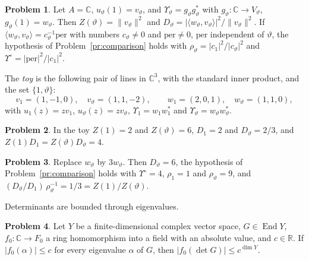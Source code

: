 \documentclass[reqno]{amsart}
\theoremstyle{definition}
\newtheorem{problem}{Problem}[section]
\theoremstyle{plain}
\theoremstyle{remark}
\newcommand{\R}{{\mathbb{R}}}
\newcommand{\C}{{\mathbb{C}}}
\newcommand{\End}{\operatorname{End}}
\begin{document}
\begin{problem}\label{pr:rank-one}
Let \(A = \C\), \(u_\vartheta(1) = v_\vartheta\), and \(\Upsilon_\vartheta = g_\vartheta g_\vartheta^*\) with \(g_\vartheta \colon \C \to V_\vartheta\), \(g_\vartheta(1) = w_\vartheta\).  Then \(Z(\vartheta) = \lVert v_\vartheta\rVert^2\) and \(D_\vartheta = \lvert\langle w_\vartheta, v_\vartheta\rangle\rvert^2/\lVert v_\vartheta\rVert^2\).  If \(\langle w_\vartheta, v_\vartheta\rangle = c_\vartheta^{-1} \mathrm{per}\) with numbers \(c_\vartheta \ne 0\) and \(\mathrm{per} \ne 0\), \(\mathrm{per}\) independent of \(\vartheta\), the hypothesis of Problem~\ref{pr:comparison} holds with \(\rho_\vartheta = \lvert c_1\rvert^2/\lvert c_\vartheta\rvert^2\) and \(\Upsilon^\circ = \lvert \mathrm{per}\rvert^2/\lvert c_1\rvert^2\).
\end{problem}

The \emph{toy} is the following pair of lines in \(\C^3\), with the standard inner product, and the set \(\{1, \vartheta\}\):
\[
  v_1 = (1,-1,0),\quad v_\vartheta = (1,1,-2),\qquad w_1 = (2,0,1),\quad w_\vartheta = (1,1,0),
\]
with \(u_1(z) = zv_1\), \(u_\vartheta(z) = zv_\vartheta\), \(\Upsilon_1 = w_1w_1^*\) and \(\Upsilon_\vartheta = w_\vartheta w_\vartheta^*\).

\begin{problem}\label{pr:toy-Z}
In the toy \(Z(1) = 2\) and \(Z(\vartheta) = 6\), \(D_1 = 2\) and \(D_\vartheta = 2/3\), and \(Z(1)D_1 = Z(\vartheta)D_\vartheta = 4\).
\end{problem}

\begin{problem}\label{pr:toy-scale}
Replace \(w_\vartheta\) by \(3w_\vartheta\).  Then \(D_\vartheta = 6\), the hypothesis of Problem~\ref{pr:comparison} holds with \(\Upsilon^\circ = 4\), \(\rho_1 = 1\) and \(\rho_\vartheta = 9\), and \((D_\vartheta/D_1)\,\rho_\vartheta^{-1} = 1/3 = Z(1)/Z(\vartheta)\).
\end{problem}

Determinants are bounded through eigenvalues.

\begin{problem}\label{pr:eigen}
Let \(Y\) be a finite-dimensional complex vector space, \(G \in \End Y\), \(f_0 \colon \C \to F_0\) a ring homomorphism into a field with an absolute value, and \(c \in \R\).  If \(\lvert f_0(\alpha)\rvert \le c\) for every eigenvalue \(\alpha\) of \(G\), then \(\lvert f_0(\det G)\rvert \le c^{\dim Y}\).
\end{problem}
\end{document}

